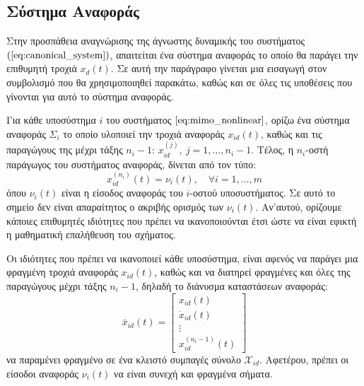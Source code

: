 
\subsection{Σύστημα Αναφοράς} \label{subsec:schema_ref}
Στην προσπάθεια αναγνώρισης της άγνωστης δυναμικής του συστήματος $(\ref{eq:canonical_system})$, απαιτείται ένα σύστημα αναφοράς το οποίο θα παράγει την επιθυμητή τροχιά $x_d(t)$. Σε αυτή την παράγραφο γίνεται μια εισαγωγή στον συμβολισμό που θα χρησιμοποιηθεί παρακάτω, καθώς και σε όλες τις υποθέσεις που γίνονται για αυτό το σύστημα αναφοράς. 


Για κάθε υποσύστημα $i$ του συστήματος $\ref{eq:mimo_nonlinear}$, ορίζω ένα σύστημα αναφοράς $\Sigma_i$ το οποίο υλοποιεί την τροχιά αναφοράς $x_{id}(t)$, καθώς και τις παραγώγους της μέχρι τάξης $n_i-1$: $x_{id}^{(j)},\: j = 1,\dots,n_i-1$. Τέλος, η $n_i$-οστή παράγωγος του συστήματος αναφοράς, δίνεται από τον τύπο:
\begin{equation}
	x_{id}^{(n_i)}(t) = \nu_i(t), \quad \forall i = 1,\dots,m
\end{equation}
όπου $\nu_i(t)$ είναι η είσοδος αναφοράς του $i$-οστού υποσυστήματος. Σε αυτό το σημείο δεν είναι απαραίτητος ο ακριβής ορισμός των $\nu_i(t)$. Αν'αυτού, ορίζουμε κάποιες επιθυμητές ιδιότητες που πρέπει να ικανοποιούνται έτσι ώστε να είναι εφικτή η μαθηματική επαλήθευση του σχήματος.

Οι ιδιότητες που πρέπει να ικανοποιεί κάθε υποσύστημα, είναι αφενός να παράγει μια φραγμένη τροχιά αναφοράς $x_{id}(t)$, καθώς και να διατηρεί φραγμένες και όλες της παραγώγους μέχρι τάξης $n_i - 1$, δηλαδή το διάνυσμα καταστάσεων αναφοράς:
\begin{equation*}
	\bar{x}_{id}(t) = 
	\begin{bmatrix}
	x_{id}(t) \\ \dot{x}_{id}(t) \\ \vdots \\ x_{id}^{(n_i-1)}(t)
	\end{bmatrix}
\end{equation*}
να παραμένει φραγμένο σε ένα κλειστό συμπαγές σύνολο $\mathcal{X}_{id}$. Αφετέρου, πρέπει οι είσοδοι αναφοράς $\nu_i(t)$ να είναι συνεχή και φραγμένα σήματα.

